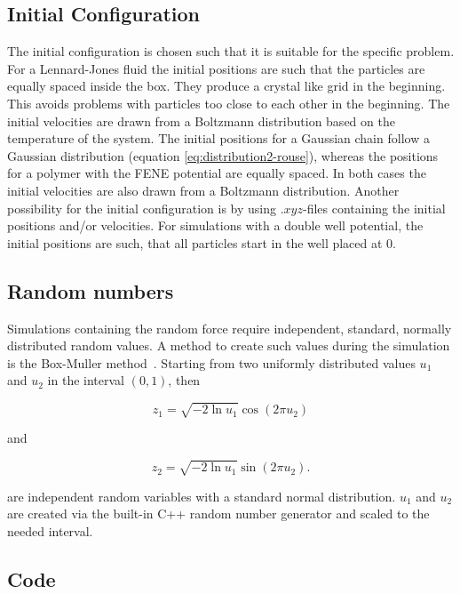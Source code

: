 \documentclass[a4paper]{article}
\begin{document}
\subsection{Initial Configuration}

The initial configuration is chosen such that it is suitable for the specific problem. For a Lennard-Jones fluid the initial positions are such that the particles are equally spaced inside the box. They produce a crystal like grid in the beginning. This avoids problems with particles too close to each other in the beginning. The initial velocities are drawn from a Boltzmann distribution based on the temperature of the system. The initial positions for a Gaussian chain follow a Gaussian distribution (equation \ref{eq:distribution2-rouse}), whereas the positions for a polymer with the FENE potential are equally spaced. In both cases the initial velocities are also drawn from a Boltzmann distribution. Another possibility for the initial configuration is by using $.xyz$-files containing the initial positions and/or velocities. For simulations with a double well potential, the initial positions are such, that all particles start in the well placed at 0.

\subsection{Random numbers}

Simulations containing the random force require independent, standard, normally distributed random values. A method to create such values during the simulation is the Box-Muller method~\cite{Box1958}. Starting from two uniformly distributed values $u_1$ and $u_2$ in the interval $(0,1)$, then

\begin{equation}
z_1 = \sqrt{-2 \ln u_1} \cos (2 \pi u_2)
\end{equation}

and

\begin{equation}
z_2 = \sqrt{-2 \ln u_1} \sin (2 \pi u_2).
\end{equation}

are independent random variables with a standard normal distribution. $u_1$ and $u_2$ are created via the built-in C++ random number generator and scaled to the needed interval.

\subsection{Code}
\end{document}
